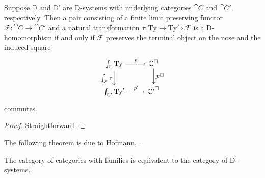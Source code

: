 \begin{lem}
Suppose $\mathbb{D}$ and $\mathbb{D}'$ are D-systems with underlying categories
$\cat{C}$ and $\cat{C}'$, respectively. Then a pair consisting of a finite
limit preserving functor
$\mathcal{F}:\cat{C}\to\cat{C}'$ and a natural transformation
$\tau:\mathrm{Ty}\to \mathrm{Ty'}\circ\mathcal{F}$ is a D-homomorphism if and
only if $\mathcal{F}$ preserves the terminal object on the nose and the induced
square
\begin{equation*}
\begin{tikzcd}
\int_{\cat{C}}\mathrm{Ty} \arrow[r,"p"] \arrow[d,swap,"{\int_{\mathcal{F}}\tau}"] & \cat{C}^{\square} \arrow[d,"\mathcal{F}^\square"] \\
\int_{\cat{C}'}\mathrm{Ty}' \arrow[r,"{p'}"] & {\cat{C}'}^\square
\end{tikzcd}
\end{equation*}
commutes.
\end{lem}

\begin{proof}
Straightforward.
\end{proof}


The following theorem is due to Hofmann, \cite[section 3.2]{Hofmann_syntax_semantics}. 

\begin{thm}\label{thm:DD}
The category of categories with families is equivalent to the category of 
D-systems.\hfill$\square$
\end{thm}

